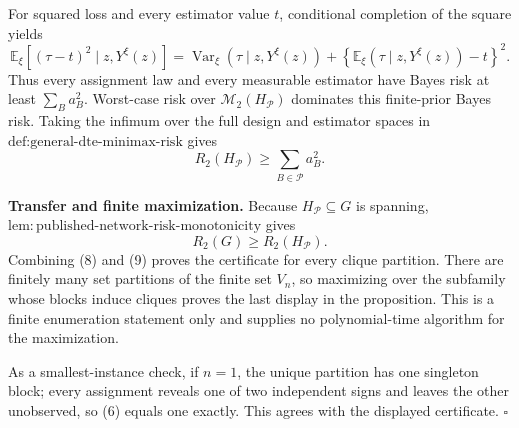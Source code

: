 For squared loss and every estimator value \(t\), conditional completion of the square yields
\[
\mathbb E_{\xi}\!\left[(\tau-t)^2\mid z,Y^{\xi}(z)\right]
=\operatorname{Var}_{\xi}(\tau\mid z,Y^{\xi}(z))
+\left\{\mathbb E_{\xi}(\tau\mid z,Y^{\xi}(z))-t\right\}^2.
\tag{7}
\]
Thus every assignment law and every measurable estimator have Bayes risk at least \(\sum_Ba_B^2\).  Worst-case risk over \(\mathcal M_2(H_{\mathcal P})\) dominates this finite-prior Bayes risk.  Taking the infimum over the full design and estimator spaces in \(\text{def:general-dte-minimax-risk}\) gives
\[
R_2(H_{\mathcal P})\geq\sum_{B\in\mathcal P}a_B^2.
\tag{8}
\]

\textbf{Transfer and finite maximization.}
Because \(H_{\mathcal P}\subseteq G\) is spanning, \(\mathrm{lem{:}published\text{-}network\text{-}risk\text{-}monotonicity}\) gives
\[
R_2(G)\geq R_2(H_{\mathcal P}).
\tag{9}
\]
Combining (8) and (9) proves the certificate for every clique partition.  There are finitely many set partitions of the finite set \(V_n\), so maximizing over the subfamily whose blocks induce cliques proves the last display in the proposition.  This is a finite enumeration statement only and supplies no polynomial-time algorithm for the maximization.

As a smallest-instance check, if \(n=1\), the unique partition has one singleton block; every assignment reveals one of two independent signs and leaves the other unobserved, so (6) equals one exactly.  This agrees with the displayed certificate. \(\square\)
